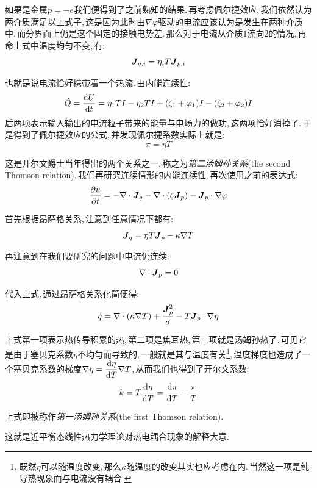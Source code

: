 如果是金属\(p=-e\)我们便得到了之前熟知的结果.\,再考虑佩尔捷效应,\,我们依然认为两介质满足以上式子,\,这是因为此时由\(\nabla\varphi\)驱动的电流应该认为是发生在两种介质中,\,而分界面上仍是这个固定的接触电势差.\,那么对于电流从介质\(1\)流向\(2\)的情况,\,再命上式中温度均匀不变,\,有:
\[\boldsymbol{J}_{q,i}=\eta_i T\boldsymbol{J}_{p,i}\]

也就是说电流恰好携带着一个热流.\,由内能连续性:
\[\dot{Q}=\frac{\textrm{d} U}{\textrm{d} t}=\eta_1 TI-\eta_2 TI+(\zeta_1+\varphi_1)I-(\zeta_2+\varphi_2)I\]
后两项表示输入输出的电流粒子带来的能量与电场力的做功,\,这两项恰好消掉了.\,于是得到了佩尔捷效应的公式,\,并发现佩尔捷系数实际上就是:
\[\pi=\eta T\]

这是开尔文爵士当年得出的两个关系之一,\,称之为\emph{第二汤姆孙关系}(the second Thomson relation).\,我们再研究连续情形的内能连续性,\,再次使用之前的表达式:
\[\frac{\partial u}{\partial t}=-\nabla\cdot\boldsymbol{J}_q-\nabla\cdot(\zeta \boldsymbol{J}_p)-\boldsymbol{J}_p\cdot\nabla\varphi\]

首先根据昂萨格关系,\,注意到任意情况下都有:
\[\boldsymbol{J}_q=\eta T\boldsymbol{J}_p-\kappa\nabla T\]

再注意到在我们要研究的问题中电流仍连续:
\[\nabla\cdot  \boldsymbol{J}_p=0\]

代入上式,\,通过昂萨格关系化简便得:
\[\dot{q}=\nabla\cdot(\kappa\nabla T)+\frac{\boldsymbol{J}_p^2}{\sigma}-T\boldsymbol{J}_p\cdot\nabla\eta\]

上式第一项表示热传导积累的热,\,第二项是焦耳热,\,第三项就是汤姆孙热了.\,可见它是由于塞贝克系数\(\eta\)不均匀而导致的,\,一般就是其与温度有关\footnote{既然\(\eta\)可以随温度改变,\,那么\(\kappa\)随温度的改变其实也应考虑在内.\,当然这一项是纯导热现象而与电流没有耦合.},\,温度梯度也造成了一个塞贝克系数的梯度\(\nabla\eta=\dfrac{\textrm{d} \eta}{\textrm{d} T}\nabla T\),\,从而我们也得到了开尔文系数:
\[k=T\frac{\textrm{d} \eta}{\textrm{d} T}=\frac{\textrm{d} \pi}{\textrm{d} T}-\frac{\pi}{T}\]

上式即被称作\emph{第一汤姆孙关系}(the first Thomson relation).

这就是近平衡态线性热力学理论对热电耦合现象的解释大意.